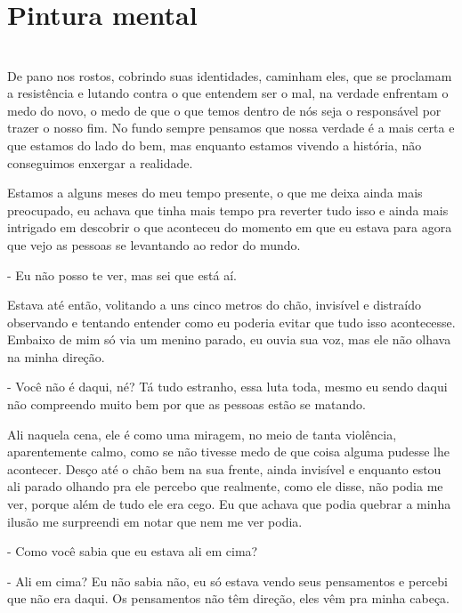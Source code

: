 \newpage


\ifdefined\useChapters
\chapter{Pintura mental}

\else
\chapter{}
\fi
De pano nos rostos, cobrindo suas identidades, caminham eles, que se proclamam a resistência e lutando contra o que entendem ser o mal, na verdade enfrentam o medo do novo, o medo de que o que temos dentro de nós seja o responsável por trazer o nosso fim. No fundo sempre pensamos que nossa verdade é a mais certa e que estamos do lado do bem, mas enquanto estamos vivendo a história, não conseguimos enxergar a realidade.

Estamos a alguns meses do meu tempo presente, o que me deixa ainda mais preocupado, eu achava que tinha mais tempo pra reverter tudo isso e ainda mais intrigado em descobrir o que aconteceu do momento em que eu estava para agora que vejo as pessoas se levantando ao redor do mundo.

- Eu não posso te ver, mas sei que está aí.

Estava até então, volitando a uns cinco metros do chão, invisível e distraído observando e tentando entender como eu poderia evitar que tudo isso acontecesse. Embaixo de mim só via um menino parado, eu ouvia sua voz, mas ele não olhava na minha direção.

- Você não é daqui, né? Tá tudo estranho, essa luta toda, mesmo eu sendo daqui não compreendo muito bem por que as pessoas estão se matando.

Ali naquela cena, ele é como uma miragem, no meio de tanta violência, aparentemente calmo, como se não tivesse medo de que coisa alguma pudesse lhe acontecer. Desço até o chão bem na sua frente, ainda invisível e enquanto estou ali parado olhando pra ele percebo que realmente, como ele disse, não podia me ver, porque além de tudo ele era cego. Eu que achava que podia quebrar a minha ilusão me surpreendi em notar que nem me ver podia.

- Como você sabia que eu estava ali em cima?

- Ali em cima? Eu não sabia não, eu só estava vendo seus pensamentos e percebi que não era daqui. Os pensamentos não têm direção, eles vêm pra minha cabeça.

